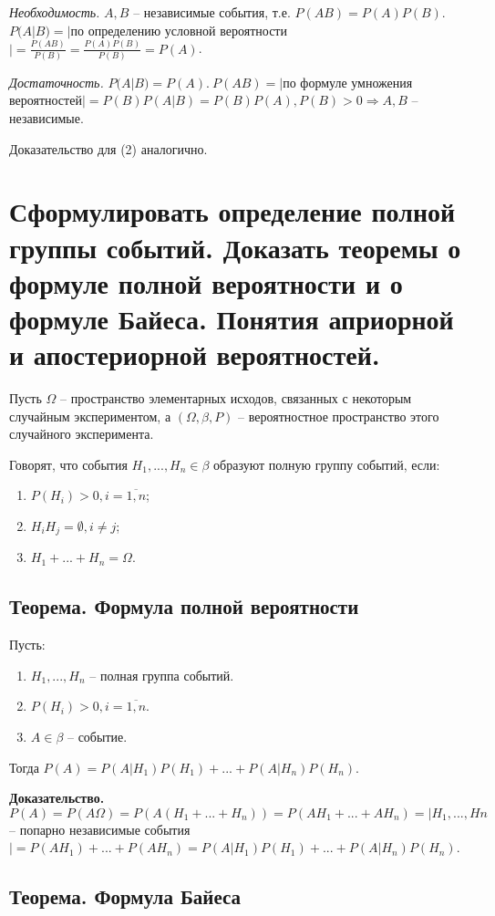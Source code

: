 \textit{Необходимость.} $A, B$ -- независимые события, т.е. $P(AB) = P(A)P(B)$. $P(A|B) = |$по определению условной вероятности$| = \frac{P(AB)}{P(B)} = \frac{P(A)P(B)}{P(B)} = P(A)$.

\textit{Достаточность.} $P(A|B) = P(A).~P(AB) = |$по формуле умножения вероятностей$|= P(B)P(A|B) = P(B)P(A), P(B) > 0 \Rightarrow A, B$ -- независимые.

Доказательство для (2) аналогично.

\section{Сформулировать определение полной группы событий. Доказать теоремы о формуле полной вероятности и о формуле Байеса. Понятия априорной и апостериорной вероятностей.}

Пусть $\Omega$ -- пространство элементарных исходов, связанных с некоторым случайным экспериментом, а $(\Omega, \beta, P)$ -- вероятностное пространство этого случайного эксперимента.

Говорят, что события $H_1, ..., H_n \in \beta$ образуют полную группу событий, если:
\begin{enumerate}[label=\arabic*)]
	\item $P(H_i) > 0, i = \overline{1, n}$;
	\item $H_iH_j = \emptyset, i \neq j$;
	\item $H_1 + ... + H_n = \Omega$.
\end{enumerate}

\subsection*{Теорема. Формула полной вероятности}

Пусть: 
\begin{enumerate}
	\item $H_1, ..., H_n$ -- полная группа событий.
	\item $P(H_i)>0, i = \overline{1,n}$.
	\item $A \in \beta$ -- событие.
\end{enumerate}
Тогда $P(A) = P(A|H_1)P(H_1)+...+P(A|H_n)P(H_n)$.

\textbf{Доказательство.} $P(A) = P(A\Omega) = P(A(H_1 + ... + H_n)) = P(AH_1 + ... + AH_n) = |H_1, ..., Hn$ -- попарно независимые события$| = P(AH_1) + ... + P(AH_n) = P(A|H_1)P(H_1) + ... + P(A|H_n)P(H_n)$.

\subsection*{Теорема. Формула Байеса}

